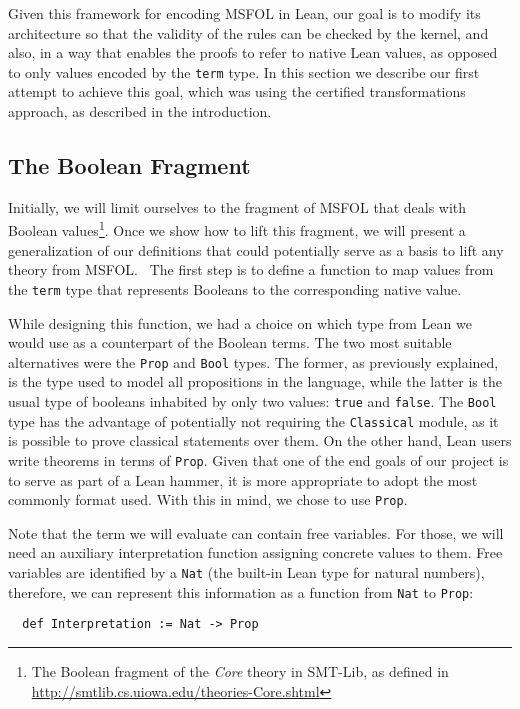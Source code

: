 Given this framework for encoding MSFOL in Lean, our goal is to
modify its architecture so that the validity of the rules can be
checked by the kernel, and also, in a way that enables the proofs to refer
to native Lean values, as opposed to only values encoded by the
\texttt{term} type. In this section we describe our first attempt
to achieve this goal, which was using the certified transformations
approach, as described in the introduction.

\subsection{The Boolean Fragment}

Initially, we will limit ourselves to the fragment of MSFOL that
deals with Boolean values\footnote{The Boolean fragment of the
\emph{Core} theory in SMT-Lib, as defined in
\url{http://smtlib.cs.uiowa.edu/theories-Core.shtml}}. Once
we show how to lift this fragment, we will present a generalization
of our definitions that could potentially serve as a basis to lift
any theory from MSFOL.\
%
The first step is to define a function to map values from the \texttt{term} type
that represents Booleans to the corresponding native value.

While designing this function, we had a
choice on which type from Lean we would use as a counterpart of the Boolean terms. The two
most suitable alternatives were the \texttt{Prop} and \texttt{Bool} types. The former, as
previously explained, is the type used to model all propositions in the language, while
the latter is the usual type of booleans inhabited by only two values: \texttt{true} and
\texttt{false}. The \texttt{Bool} type has the advantage of potentially not requiring the
\texttt{Classical} module, as it is possible to prove classical statements over them. On
the other hand, Lean users write theorems in terms of \texttt{Prop}.
Given that one of the
end goals of our project is to serve as part of a Lean hammer, it is more appropriate
to adopt the most commonly format used. With this in mind, we chose to use \texttt{Prop}.


Note that the term we will evaluate can contain free variables. For those, we will need an auxiliary interpretation function assigning concrete values to them.
Free variables are
identified by a \texttt{Nat} (the built-in Lean type for natural numbers), therefore, we can
represent this information as a function from \texttt{Nat} to
\texttt{Prop}:

\begin{verbatim}
  def Interpretation := Nat -> Prop
\end{verbatim}


